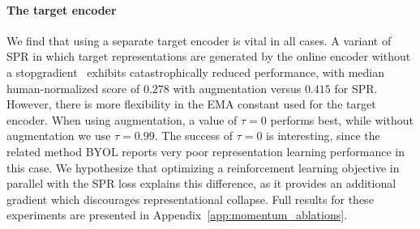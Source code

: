 \begin{table}
    \caption{Scores on the 26 Atari games under consideration for ablated variants of SPR. All variants listed here use data augmentation.}
    \label{tab:temporal_ablations}
    \centering
\end{table}

\paragraph{The target encoder}
\label{sec:momentum_ablations}
We find that using a separate target encoder is vital in all cases.  A variant of SPR in which target representations are generated by the online encoder without a stopgradient~\citep[as done by e.g.,][]{deepMDP} exhibits catastrophically reduced performance, with median human-normalized score of $0.278$ with augmentation versus $0.415$ for SPR.  However, there is more flexibility in the EMA constant used for the target encoder.  When using augmentation, a value of $\tau=0$ performs best, while without augmentation we use $\tau=0.99$.  The success of $\tau=0$ is interesting, since the related method BYOL reports very poor representation learning performance in this case.  We hypothesize that optimizing a reinforcement learning objective in parallel with the SPR loss explains this difference, as it provides an additional gradient which discourages representational collapse.  Full results for these experiments are presented in Appendix~\ref{app:momentum_ablations}.

